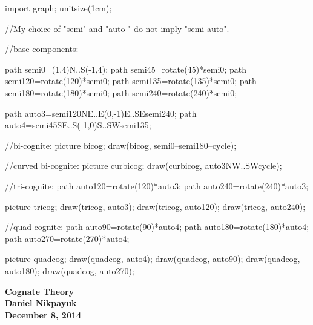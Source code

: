 \documentclass[twoside]{article}
\begin{document}
\begin{asydef}
import graph;
unitsize(1cm);

//My choice of "semi" and "auto " do not imply "semi-auto".

//base components:

	path semi0=(1,4){N}..{S}(-1,4);
	path semi45=rotate(45)*semi0;
	path semi120=rotate(120)*semi0;
	path semi135=rotate(135)*semi0;
	path semi180=rotate(180)*semi0;
	path semi240=rotate(240)*semi0;

	path auto3=semi120{NE}..{E}(0,-1){E}..{SE}semi240;
	path auto4=semi45{SE}..{S}(-1,0){S}..{SW}semi135;

//bi-cognite:
	picture bicog;
	draw(bicog, semi0--semi180--cycle);

//curved bi-cognite:
	picture curbicog;
	draw(curbicog, auto3{NW}..{SW}cycle);

//tri-cognite:
	path auto120=rotate(120)*auto3;
	path auto240=rotate(240)*auto3;

	picture tricog;
	draw(tricog, auto3);
	draw(tricog, auto120);
	draw(tricog, auto240);

//quad-cognite:
	path auto90=rotate(90)*auto4;
	path auto180=rotate(180)*auto4;
	path auto270=rotate(270)*auto4;

	picture quadcog;
	draw(quadcog, auto4);
	draw(quadcog, auto90);
	draw(quadcog, auto180);
	draw(quadcog, auto270);

\end{asydef}

\begin{center}
\bfseries\Large Cognate Theory \\ \normalsize Daniel Nikpayuk \\ December 8, 2014
\end{center}
\end{document}
